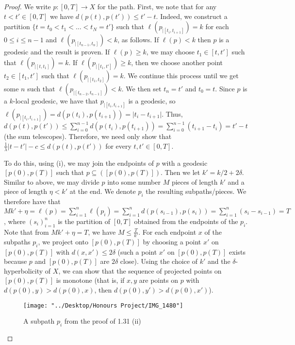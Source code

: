 \documentclass[12pt]{article}
\newcommand{\vs}{\vskip10pt}
\begin{document}
\begin{proof}
		We write $p: [0, T] \rightarrow X$ for the path. First, we note that for any $t < t' \in [0,T]$ we have $d(p(t), p(t')) \leq  t' - t $. Indeed, we construct a partition $\{t = t_0 < t_1 < ... < t_N = t'\}$ such that $\ell(p_{\vert [t_i, t_{i+1}]}) = k$ for each $0 \leq i  \leq n-1$ and $\ell(p_{\vert [t_{n-1}, t_{n}]}) < k$, as follows. If $\ell(p) < k$ then $p$ is a geodesic and the result is proven. If $\ell(p) \geq k$, we may choose $t_1 \in [t,t']$ such that $\ell(p_{\vert [t, t_1]}) = k$. If $\ell(p_{\vert [t_1, t']}) \geq k$, then we choose another point $t_2 \in [t_1, t']$ such that $\ell(p_{\vert [t_1, t_2]}) = k$. We continue this process until we get some $n$ such that $\ell(p_{\vert [t_{n-2}, t_{n-1}]}) < k$. We then set $t_{n} = t'$ and $t_0 = t$. Since $p$ is a $k$-local geodesic, we have that $p_{\vert [t_i, t_{i+1}]}$ is a geodesic, so $\ell(p_{\vert [t_i, t_{i+1}]}) = d(p(t_i), p(t_{i+1})) = \vert t_i - t_{i+1} \vert$. Thus, $d(p(t), p(t')) \leq \sum_{i = 0}^{n-1} d(p(t_i), p(t_{i+1})) = \sum_{i=0}^{n-1} (t_{i+1} - t_i) = t' - t$ (the sum telescopes). Therefore, we need only show that $\frac{1}{\lambda}  \vert t - t' \vert - c \leq d(p(t), p(t'))$ for every $t,t' \in [0, T]$. 
		
		\vs 
		
		To do this, using (i), we may join the endpoints of $p$ with a geodesic $[p(0), p(T)]$ such that $p \subseteq([p(0), p(T)])$. Then we let $k' = k/2 + 2 \delta$. Similar to above, we may divide $p$ into some number $M$ pieces of length $k'$ and a piece of length $\eta < k'$ at the end. We denote $p_i$ the resulting subpaths/pieces. We therefore have that $Mk' + \eta = \ell(p) = \sum_{i=1}^n \ell(p_i) = \sum_{i=1}^n d(p(s_{i-1}), p(s_i)) = \sum_{i=1}^n (s_i - s_{i-1}) = T$, where $(s_i)_{i=1}^n$ is the partition of $[0, T]$ obtained from the endpoints of the $p_i$. Note that from $Mk' + \eta = T$, we have $M \leq \frac{T}{k'}$. For each endpoint $x$ of the subpaths $p_i$, we project onto $[p(0), p(T)]$ by choosing a point $x'$ on $[p(0), p(T)]$ with $d(x, x') \leq 2 \delta$ (such a point $x'$ on $[p(0), p(T)]$ exists because $p$ and $[p(0), p(T)]$ are $2 \delta$ close). Using the choice of $k'$ and the $\delta$-hyperbolicity of $X$, we can show that the sequence of projected points on $[p(0), p(T)]$ is monotone (that is, if $x,y$ are points on $p$ with $d(p(0), y) > d(p(0), x)$, then $d(p(0), y') > d(p(0), x')$). 
		
		\vs
		
		
\begin{figure} [H]
	\centering
	\texttt{[image: "../Desktop/Honours Project/IMG\_1480"]}
	\caption{A subpath $p_i$ from the proof of 1.31 (ii)}
	\label{fig:img1480}
\end{figure}
		

\end{proof}
\end{document}
